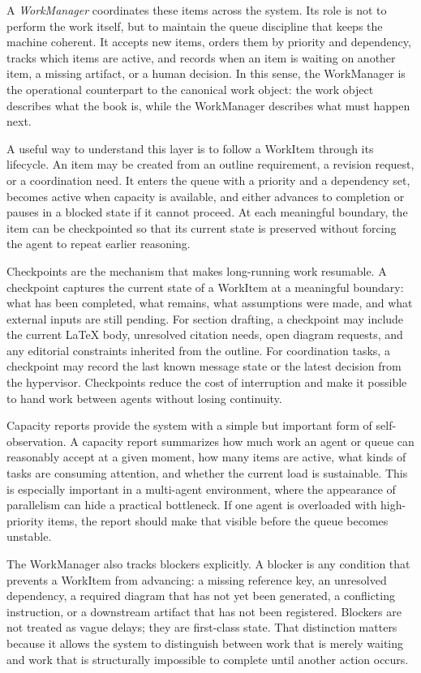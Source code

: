 \documentclass[11pt]{article}
\begin{document}
A \emph{WorkManager} coordinates these items across the system. Its role is not to perform the work itself, but to maintain the queue discipline that keeps the machine coherent. It accepts new items, orders them by priority and dependency, tracks which items are active, and records when an item is waiting on another item, a missing artifact, or a human decision. In this sense, the WorkManager is the operational counterpart to the canonical work object: the work object describes what the book is, while the WorkManager describes what must happen next.

A useful way to understand this layer is to follow a WorkItem through its lifecycle. An item may be created from an outline requirement, a revision request, or a coordination need. It enters the queue with a priority and a dependency set, becomes active when capacity is available, and either advances to completion or pauses in a blocked state if it cannot proceed. At each meaningful boundary, the item can be checkpointed so that its current state is preserved without forcing the agent to repeat earlier reasoning.

Checkpoints are the mechanism that makes long-running work resumable. A checkpoint captures the current state of a WorkItem at a meaningful boundary: what has been completed, what remains, what assumptions were made, and what external inputs are still pending. For section drafting, a checkpoint may include the current \LaTeX{} body, unresolved citation needs, open diagram requests, and any editorial constraints inherited from the outline. For coordination tasks, a checkpoint may record the last known message state or the latest decision from the hypervisor. Checkpoints reduce the cost of interruption and make it possible to hand work between agents without losing continuity.

Capacity reports provide the system with a simple but important form of self-observation. A capacity report summarizes how much work an agent or queue can reasonably accept at a given moment, how many items are active, what kinds of tasks are consuming attention, and whether the current load is sustainable. This is especially important in a multi-agent environment, where the appearance of parallelism can hide a practical bottleneck. If one agent is overloaded with high-priority items, the report should make that visible before the queue becomes unstable.

The WorkManager also tracks blockers explicitly. A blocker is any condition that prevents a WorkItem from advancing: a missing reference key, an unresolved dependency, a required diagram that has not yet been generated, a conflicting instruction, or a downstream artifact that has not been registered. Blockers are not treated as vague delays; they are first-class state. That distinction matters because it allows the system to distinguish between work that is merely waiting and work that is structurally impossible to complete until another action occurs.
\end{document}
